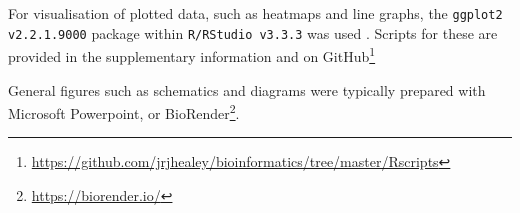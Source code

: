 For visualisation of plotted data, such as heatmaps and line graphs, the \texttt{ggplot2 v2.2.1.9000} package \citep{Wickham2009} within \texttt{R/RStudio v3.3.3} was used \citep{RStudioTeam2015, RCoreTeam2014}. Scripts for these are provided in the supplementary information and on GitHub\footnote{\url{https://github.com/jrjhealey/bioinformatics/tree/master/Rscripts}}

General figures such as schematics and diagrams were typically prepared with Microsoft Powerpoint, or BioRender\footnote{\url{https://biorender.io/}}.



